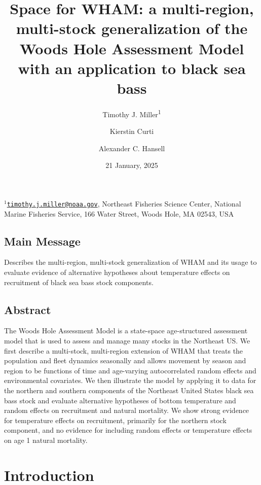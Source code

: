 \documentclass[
]{article}
\title{Space for WHAM: a multi-region, multi-stock generalization of the
Woods Hole Assessment Model with an application to black sea bass}
\author{Timothy J. Miller\textsuperscript{1} \and Kierstin
Curti \and Alexander C. Hansell}
\date{21 January, 2025}
\begin{document}
\maketitle

\(^1\)\href{mailto:timothy.j.miller@noaa.gov}{\nolinkurl{timothy.j.miller@noaa.gov}},
Northeast Fisheries Science Center, National Marine Fisheries Service,
166 Water Street, Woods Hole, MA 02543, USA\\

\pagebreak

\hypertarget{main-message}{%
\subsection*{Main Message}\label{main-message}}

Describes the multi-region, multi-stock generalization of WHAM and its
usage to evaluate evidence of alternative hypotheses about temperature
effects on recruitment of black sea bass stock components.

\hypertarget{abstract}{%
\subsection*{Abstract}\label{abstract}}

The Woods Hole Assessment Model is a state-space age-structured
assessment model that is used to assess and manage many stocks in the
Northeast US. We first describe a multi-stock, multi-region extension of
WHAM that treats the population and fleet dynamics seasonally and allows
movement by season and region to be functions of time and age-varying
autocorrelated random effects and environmental covariates. We then
illustrate the model by applying it to data for the northern and
southern components of the Northeast United States black sea bass stock
and evaluate alternative hypotheses of bottom temperature and random
effects on recruitment and natural mortality. We show strong evidence
for temperature effects on recruitment, primarily for the northern stock
component, and no evidence for including random effects or temperature
effects on age 1 natural mortality.

\pagebreak

\hypertarget{introduction}{%
\section*{Introduction}\label{introduction}}
\end{document}
